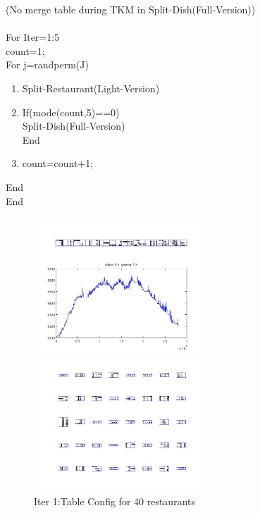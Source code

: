 \documentclass{article}
\begin{document}
\begin{spacing}{1.1}
(No merge table during TKM in Split-Dish(Full-Version))\\ \\
For Iter=1:5\\
count=1;\\
For j=randperm(J) 
\begin{enumerate}
\item Split-Restaurant(Light-Version) 
\item If(mode(count,5)==0)\\
Split-Dish(Full-Version)\\
End
\item count=count+1;
\end{enumerate}
End\\
End\\
\begin{figure}[h] 
  \begin{minipage}[b]{0.5\textwidth} 
    \centering 
    \includegraphics[width=2.5in,height=2in]{init1_5_nmt85.jpg} 
    \caption{Iter 1:Dish Config and -log Probability}
    \label{fig:by:table} 
  \end{minipage}%
  \begin{minipage}[b]{0.5\textwidth} 
    \centering 
    \includegraphics[width=2.5in,height=2in]{init1_5_nmt85d.jpg} 
    \caption{Iter 1:Table Config for 40 restaurants}
    \label{fig:by:table}  
   \end{minipage}%
\end{figure}
\begin{figure}[h] 
  \begin{minipage}[b]{0.5\textwidth} 

\end{minipage}
\end{figure}
\end{spacing}
\end{document}
